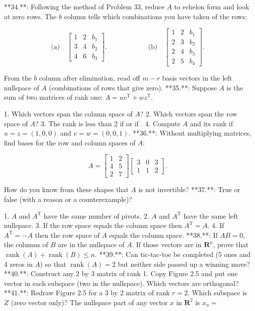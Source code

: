 

**34.**: Following the method of Problem 33, reduce \(A\) to echelon form and look at zero rows. The \(b\) column tells which combinations you have taken of the rows:

\[\text{(a)}\quad\begin{bmatrix}1&2&b_{1}\\ 3&4&b_{2}\\ 4&6&b_{3}\end{bmatrix}.\qquad\qquad\qquad\text{(b)}\quad\begin{bmatrix}1&2&b_{1 }\\ 2&3&b_{2}\\ 2&4&b_{3}\\ 2&5&b_{4}\end{bmatrix}.\]

From the \(b\) column after elimination, read off \(m-r\) basis vectors in the left nullspace of \(A\) (combinations of rows that give zero).
**35.**: Suppose \(A\) is the sum of two matrices of rank one: \(A=uv^{\text{T}}+wz^{\text{T}}\).

1. Which vectors span the column space of \(A\)?
2. Which vectors span the row space of \(A\)?
3. The rank is less than 2 if or if .
4. Compute \(A\) and its rank if \(u=z=(1,0,0)\) and \(v=w=(0,0,1)\).
**36.**: Without multiplying matrices, find bases for the row and column spaces of \(A\):

\[A=\begin{bmatrix}1&2\\ 4&5\\ 2&7\end{bmatrix}\begin{bmatrix}3&0&3\\ 1&1&2\end{bmatrix}.\]

How do you know from these shapes that \(A\) is not invertible?
**37.**: True or false (with a reason or a counterexample)?

1. \(A\) and \(A^{\text{T}}\) have the same number of pivots.
2. \(A\) and \(A^{\text{T}}\) have the same left nullspace.
3. If the row space equals the column space then \(A^{\text{T}}=A\).
4. If \(A^{\text{T}}=-A\) then the row space of \(A\) equals the column space.
**38.**: If \(AB=0\), the columns of \(B\) are in the nullspace of \(A\). If those vectors are in \(\mathbf{R}^{n}\), prove that \(\operatorname{rank}(A)+\operatorname{rank}(B)\leq n\).
**39.**: Can tic-tac-toe be completed (5 ones and 4 zeros in \(A\)) so that \(\operatorname{rank}(A)=2\) but neither side passed up a winning move?
**40.**: Construct any 2 by 3 matrix of rank 1. Copy Figure 2.5 and put one vector in each subspace (two in the nullspace). Which vectors are orthogonal?
**41.**: Redraw Figure 2.5 for a 3 by 2 matrix of rank \(r=2\). Which subspace is \(Z\) (zero vector only)? The nullspace part of any vector \(x\) in \(\mathbf{R}^{2}\) is \(x_{n}=\)